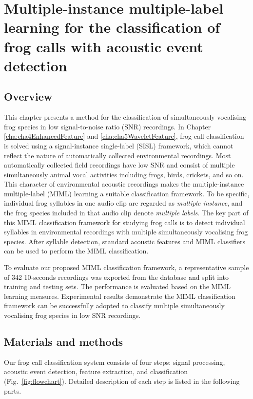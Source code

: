 
\chapter{Multiple-instance multiple-label learning for the classification of frog calls with acoustic event detection}
\label{cha:cha6MIML}


\section{Overview}
\label{sec:intro}

This chapter presents a method for the classification of simultaneously vocalising frog species in low signal-to-noise ratio (SNR) recordings. In Chapter \ref{cha:cha4EnhancedFeature} and \ref{cha:cha5WaveletFeature}, frog call classification is solved using a signal-instance single-label (SISL) framework, which cannot reflect the nature of automatically collected environmental recordings. Most automatically collected field recordings have low SNR and consist of multiple simultaneously animal vocal activities including frogs, birds, crickets, and so on. This character of environmental acoustic recordings makes the multiple-instance multiple-label (MIML) learning a suitable classification framework. To be specific, individual frog syllables in one audio clip are regarded as \textit{multiple instance}, and the frog species included in that audio clip denote \textit{multiple labels}. 
The key part of this MIML classification framework for studying frog calls is to detect individual syllables in environmental recordings with multiple simultaneously vocalising frog species. After syllable detection, standard acoustic features and MIML classifiers can be used to perform the MIML classification.


To evaluate our proposed MIML classification framework, a representative sample of 342 10-seconds recordings was exported from the database and split into training and testing sets. The performance is evaluated based on the MIML learning measures. Experimental results demonstrate the MIML classification framework can be successfully adopted to classify multiple simultaneously vocalising frog species in low SNR recordings.



\section{Materials and methods}
Our frog call classification system consists of
four steps: signal processing, acoustic event detection, feature
extraction, and classification (Fig.~\ref{fig:flowchart}). Detailed description of each step is listed in the following parts. 

